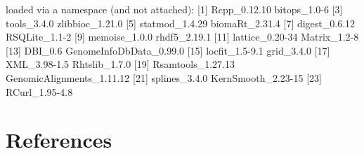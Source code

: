 \documentclass[12pt]{report}
\renewenvironment{Schunk}{\vspace{0pt}}{\vspace{0pt}}
\begin{document}
\begin{Schunk}
\begin{Soutput}
loaded via a namespace (and not attached):
 [1] Rcpp_0.12.10              bitops_1.0-6             
 [3] tools_3.4.0               zlibbioc_1.21.0          
 [5] statmod_1.4.29            biomaRt_2.31.4           
 [7] digest_0.6.12             RSQLite_1.1-2            
 [9] memoise_1.0.0             rhdf5_2.19.1             
[11] lattice_0.20-34           Matrix_1.2-8             
[13] DBI_0.6                   GenomeInfoDbData_0.99.0  
[15] locfit_1.5-9.1            grid_3.4.0               
[17] XML_3.98-1.5              Rhtslib_1.7.0            
[19] Rsamtools_1.27.13         GenomicAlignments_1.11.12
[21] splines_3.4.0             KernSmooth_2.23-15       
[23] RCurl_1.95-4.8           
\end{Soutput}
\end{Schunk}

\section{References}


\end{document}
